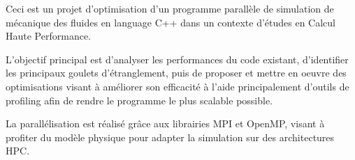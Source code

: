 Ceci est un projet d'optimisation d'un programme parallèle de simulation de mécanique des fluides en language C++ dans un contexte d'études en Calcul Haute Performance.

L'objectif principal est d'analyser les performances du code existant, d'identifier les principaux goulets d'étranglement, puis de proposer et mettre en oeuvre des optimisations visant à améliorer son efficacité à l'aide principalement d'outils de profiling afin de rendre le programme le plus scalable possible.

La parallélisation est réalisé grâce aux librairies MPI et OpenMP, visant à profiter du modèle physique pour adapter la simulation sur des architectures HPC.